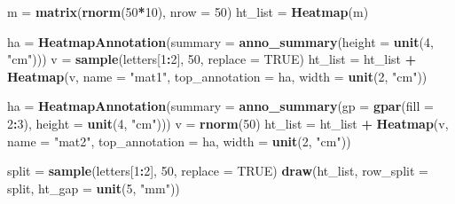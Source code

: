 \documentclass[]{book}
\newenvironment{Shaded}{\begin{snugshade}}{\end{snugshade}}
\newcommand{\KeywordTok}[1]{\textcolor[rgb]{0.13,0.29,0.53}{\textbf{#1}}}
\newcommand{\DataTypeTok}[1]{\textcolor[rgb]{0.13,0.29,0.53}{#1}}
\newcommand{\DecValTok}[1]{\textcolor[rgb]{0.00,0.00,0.81}{#1}}
\newcommand{\StringTok}[1]{\textcolor[rgb]{0.31,0.60,0.02}{#1}}
\newcommand{\OtherTok}[1]{\textcolor[rgb]{0.56,0.35,0.01}{#1}}
\newcommand{\OperatorTok}[1]{\textcolor[rgb]{0.81,0.36,0.00}{\textbf{#1}}}
\newcommand{\NormalTok}[1]{#1}
\theoremstyle{definition}
\theoremstyle{definition}
\theoremstyle{definition}
\theoremstyle{remark}
\begin{document}
\begin{Shaded}
\begin{Highlighting}[]
\NormalTok{m =}\StringTok{ }\KeywordTok{matrix}\NormalTok{(}\KeywordTok{rnorm}\NormalTok{(}\DecValTok{50}\OperatorTok{*}\DecValTok{10}\NormalTok{), }\DataTypeTok{nrow =} \DecValTok{50}\NormalTok{)}
\NormalTok{ht_list =}\StringTok{ }\KeywordTok{Heatmap}\NormalTok{(m)}

\NormalTok{ha =}\StringTok{ }\KeywordTok{HeatmapAnnotation}\NormalTok{(}\DataTypeTok{summary =} \KeywordTok{anno_summary}\NormalTok{(}\DataTypeTok{height =} \KeywordTok{unit}\NormalTok{(}\DecValTok{4}\NormalTok{, }\StringTok{"cm"}\NormalTok{)))}
\NormalTok{v =}\StringTok{ }\KeywordTok{sample}\NormalTok{(letters[}\DecValTok{1}\OperatorTok{:}\DecValTok{2}\NormalTok{], }\DecValTok{50}\NormalTok{, }\DataTypeTok{replace =} \OtherTok{TRUE}\NormalTok{)}
\NormalTok{ht_list =}\StringTok{ }\NormalTok{ht_list }\OperatorTok{+}\StringTok{ }\KeywordTok{Heatmap}\NormalTok{(v, }\DataTypeTok{name =} \StringTok{"mat1"}\NormalTok{, }\DataTypeTok{top_annotation =}\NormalTok{ ha, }\DataTypeTok{width =} \KeywordTok{unit}\NormalTok{(}\DecValTok{2}\NormalTok{, }\StringTok{"cm"}\NormalTok{))}

\NormalTok{ha =}\StringTok{ }\KeywordTok{HeatmapAnnotation}\NormalTok{(}\DataTypeTok{summary =} \KeywordTok{anno_summary}\NormalTok{(}\DataTypeTok{gp =} \KeywordTok{gpar}\NormalTok{(}\DataTypeTok{fill =} \DecValTok{2}\OperatorTok{:}\DecValTok{3}\NormalTok{), }
    \DataTypeTok{height =} \KeywordTok{unit}\NormalTok{(}\DecValTok{4}\NormalTok{, }\StringTok{"cm"}\NormalTok{)))}
\NormalTok{v =}\StringTok{ }\KeywordTok{rnorm}\NormalTok{(}\DecValTok{50}\NormalTok{)}
\NormalTok{ht_list =}\StringTok{ }\NormalTok{ht_list }\OperatorTok{+}\StringTok{ }\KeywordTok{Heatmap}\NormalTok{(v, }\DataTypeTok{name =} \StringTok{"mat2"}\NormalTok{, }\DataTypeTok{top_annotation =}\NormalTok{ ha, }\DataTypeTok{width =} \KeywordTok{unit}\NormalTok{(}\DecValTok{2}\NormalTok{, }\StringTok{"cm"}\NormalTok{))}

\NormalTok{split =}\StringTok{ }\KeywordTok{sample}\NormalTok{(letters[}\DecValTok{1}\OperatorTok{:}\DecValTok{2}\NormalTok{], }\DecValTok{50}\NormalTok{, }\DataTypeTok{replace =} \OtherTok{TRUE}\NormalTok{)}
\KeywordTok{draw}\NormalTok{(ht_list, }\DataTypeTok{row_split =}\NormalTok{ split, }\DataTypeTok{ht_gap =} \KeywordTok{unit}\NormalTok{(}\DecValTok{5}\NormalTok{, }\StringTok{"mm"}\NormalTok{))}
\end{Highlighting}
\end{Shaded}
\end{document}
